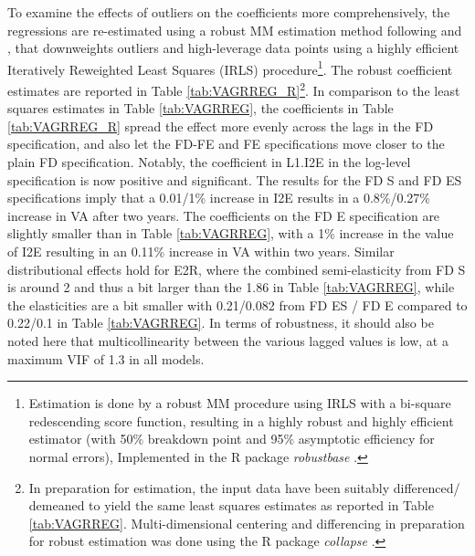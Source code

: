 \documentclass[a4paper]{article}
\begin{document}
To examine the effects of outliers on the coefficients more comprehensively, the regressions are re-estimated using a robust MM estimation method following \citet{yohai1987high} and \citet{koller2011sharpening}, that downweights outliers and high-leverage data points using a highly efficient Iteratively Reweighted Least Squares (IRLS) procedure\footnote{Estimation is done by a robust MM procedure using IRLS with a bi-square redescending score function, resulting in a highly robust and highly efficient estimator (with 50\% breakdown point and 95\% asymptotic efficiency for normal errors), Implemented in the R package \textit{robustbase} \citep{rousseeuw2009robustbase}.}. The robust coefficient estimates are reported in Table \ref{tab:VAGRREG_R}\footnote{In preparation for estimation, the input data have been suitably differenced/ demeaned to yield the same least squares estimates as reported in Table \ref{tab:VAGRREG}. Multi-dimensional centering and differencing in preparation for robust estimation was done using the R package \textit{collapse} \citep{collapse2021}.}. In comparison to the least squares estimates in Table \ref{tab:VAGRREG}, the coefficients in Table \ref{tab:VAGRREG_R} spread the effect more evenly across the lags in the FD specification, and also let the FD-FE and FE specifications move closer to the plain FD specification. Notably, the coefficient in L1.I2E in the log-level specification is now positive and significant. The results for the FD S and FD ES specifications imply that a 0.01/1\% increase in I2E results in a 0.8\%/0.27\% increase in VA after two years. The coefficients on the FD E specification are slightly smaller than in Table  \ref{tab:VAGRREG}, with a 1\% increase in the value of I2E resulting in an 0.11\% increase in VA within two years. Similar distributional effects hold for E2R, where the combined semi-elasticity from FD S is around 2 and thus a bit larger than the 1.86 in Table \ref{tab:VAGRREG}, while the elasticities are a bit smaller with 0.21/0.082 from FD ES / FD E compared to 0.22/0.1 in Table \ref{tab:VAGRREG}. In terms of robustness, it should also be noted here that multicollinearity between the various lagged values is low, at a maximum VIF of 1.3 in all models. 
\end{document}
